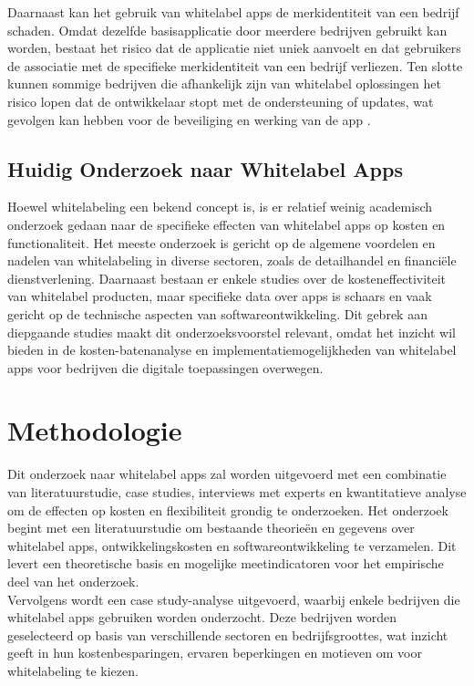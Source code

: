 Daarnaast kan het gebruik van whitelabel apps de merkidentiteit van een bedrijf schaden. 
Omdat dezelfde basisapplicatie door meerdere bedrijven gebruikt kan worden, bestaat het risico dat de applicatie niet uniek aanvoelt en dat gebruikers de associatie met de specifieke merkidentiteit van een bedrijf verliezen. 
Ten slotte kunnen sommige bedrijven die afhankelijk zijn van whitelabel oplossingen het risico lopen dat de ontwikkelaar stopt met de ondersteuning of updates, wat gevolgen kan hebben voor de beveiliging en werking van de app \autocite{Vendesta2023}.

\subsection{Huidig Onderzoek naar Whitelabel Apps}
Hoewel whitelabeling een bekend concept is, is er relatief weinig academisch onderzoek gedaan naar de specifieke effecten van whitelabel apps op kosten en functionaliteit. 
Het meeste onderzoek is gericht op de algemene voordelen en nadelen van whitelabeling in diverse sectoren, zoals de detailhandel en financiële dienstverlening. 
Daarnaast bestaan er enkele studies over de kosteneffectiviteit van whitelabel producten, maar specifieke data over apps is schaars en vaak gericht op de technische aspecten van softwareontwikkeling. 
Dit gebrek aan diepgaande studies maakt dit onderzoeksvoorstel relevant, omdat het inzicht wil bieden in de kosten-batenanalyse en implementatiemogelijkheden van whitelabel apps voor bedrijven die digitale toepassingen overwegen.
\section{Methodologie}%
\label{sec:methodologie}

Dit onderzoek naar whitelabel apps zal worden uitgevoerd met een combinatie van literatuurstudie, case studies, interviews met experts en kwantitatieve analyse om de effecten op kosten en flexibiliteit grondig te onderzoeken.
Het onderzoek begint met een literatuurstudie om bestaande theorieën en gegevens over whitelabel apps, ontwikkelingskosten en softwareontwikkeling te verzamelen. 
Dit levert een theoretische basis en mogelijke meetindicatoren voor het empirische deel van het onderzoek. \\

Vervolgens wordt een case study-analyse uitgevoerd, waarbij enkele bedrijven die whitelabel apps gebruiken worden onderzocht. 
Deze bedrijven worden geselecteerd op basis van verschillende sectoren en bedrijfsgroottes, wat inzicht geeft in hun kostenbesparingen, ervaren beperkingen en motieven om voor whitelabeling te kiezen.\\

